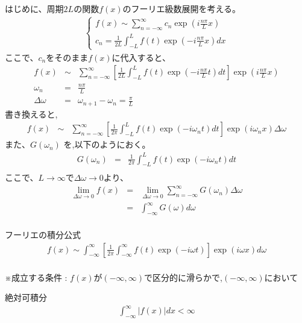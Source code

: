 \documentclass[a4paper]{jsarticle}
\begin{document}
はじめに、周期$2L$の関数$f\left(x\right)$のフーリエ級数展開を考える。
\begin{eqnarray*}
    \begin{cases}
        \displaystyle f\left(x\right) \sim \sum^{\infty}_{n=-\infty} c_n \exp{\left(i \frac{n\pi}{L}x\right)}\\
        \displaystyle c_n = \displaystyle\frac{1}{2L}\int^{L}_{-L}f\left(t\right) \exp{\left(-i \frac{n\pi}{L}x\right)} dx
    \end{cases}
\end{eqnarray*}
ここで、$c_n$をそのまま$f\left(x\right)$に代入すると、
\begin{eqnarray*}
  f\left(x\right) &\sim& \sum^{\infty}_{n=-\infty} \left[ \frac{1}{2L}\int^{L}_{-L}f\left(t\right) \exp{\left(-i \frac{n\pi}{L}t\right)} dt\right] \exp{\left(i \frac{n\pi}{L}x\right)}\\
\omega_n &=& \frac{n\pi}{L}\\
\Delta \omega &=& \omega_{n+1} -\omega_n = \frac{\pi}{L}
\end{eqnarray*}
書き換えると,
\begin{eqnarray*}
    f\left(x\right) &\sim& \sum^{\infty}_{n=-\infty} \left[ \frac{1}{2\pi}\int^{L}_{-L}f\left(t\right) \exp{\left(-i \omega_n  t\right)} dt\right] \exp{\left(i \omega_n x \right)} \Delta \omega
\end{eqnarray*}
また、$G\left(\omega_n\right)$ を,以下のようにおく。
\begin{eqnarray*}
    G\left(\omega_n\right) &=&  \frac{1}{2\pi}\int^{L}_{-L}f\left(t\right) \exp{\left(-i \omega_n t \right)} dt\\
\end{eqnarray*}
ここで、$L \rightarrow \infty$で$\Delta \omega \rightarrow 0$より、
\begin{eqnarray*}
    \lim_{\Delta \omega \rightarrow 0} f\left(x\right) 
    &=& \lim_{\Delta \omega \rightarrow 0} \sum_{n=-\infty}^{\infty} G\left(\omega_n\right) \Delta \omega\\
    &=& \int^{\infty}_{-\infty} G\left(\omega\right) d\omega\\
\end{eqnarray*}
\begin{itembox}[l]{フーリエの積分公式}
    \begin{eqnarray*}
        f\left(x\right) \sim \int^{\infty}_{-\infty}\left[ \frac{1}{2\pi} \int^{\infty}_{-\infty}f\left(t\right)\exp\left(-i \omega t\right)\right] \exp\left(i \omega x\right) d\omega\\
    \end{eqnarray*}
    \begin{center}
        ※成立する条件 : $f\left(x\right)$が$\left(-\infty,\infty\right)$で区分的に滑らかで,$\left(-\infty,\infty\right)$において\\ 
    \end{center}
\end{itembox}
\begin{itembox}[l]{絶対可積分}
    \begin{eqnarray*}
        \int^{\infty}_{-\infty}\left| f\left(x\right)\right| dx < \infty\\
    \end{eqnarray*}
\end{itembox}
\end{document}
